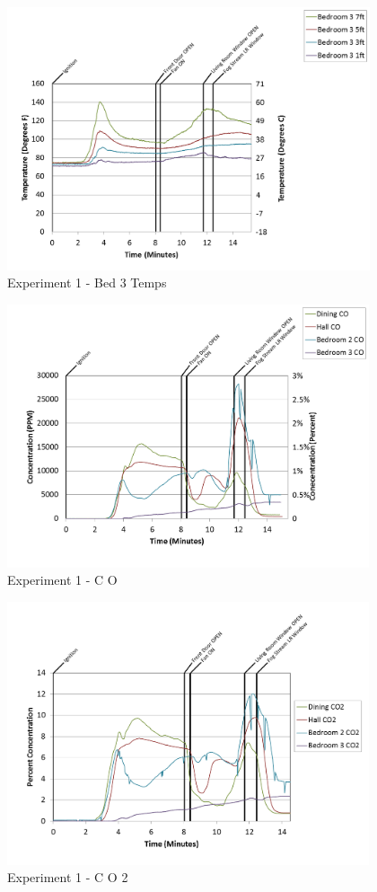 \documentclass{article}
\begin{document}
\begin{appendices}
\begin{figure}[h!]
	\centering
	\includegraphics[height=3.05in]{0_Images/Results_Charts/Exp_1_Charts/Bed3Temps.png}
	\caption{Experiment 1 - Bed 3 Temps}
\end{figure}

\clearpage

\begin{figure}[h!]
	\centering
	\includegraphics[height=3.05in]{0_Images/Results_Charts/Exp_1_Charts/CO.png}
	\caption{Experiment 1 - C O}
\end{figure}


\begin{figure}[h!]
	\centering
	\includegraphics[height=3.05in]{0_Images/Results_Charts/Exp_1_Charts/CO2.png}
	\caption{Experiment 1 - C O 2}
\end{figure}


\end{appendices}
\end{document}
